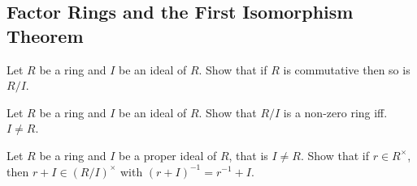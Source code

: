 \subsection{Factor Rings and the First Isomorphism Theorem}
\item Let $R$ be a ring and $I$ be an ideal of $R$. Show that if $R$ is commutative then so is $R/I$.
\item Let $R$ be a ring and $I$ be an ideal of $R$. Show that $R/I$ is a non-zero ring iff. $I \ne R$.
\item Let $R$ be a ring and $I$ be a proper ideal of $R$, that is $I \ne R$. Show that if $r \in R^{\times}$, then $r + I \in (R/I)^{\times}$ with $(r+I)^{-1} = r^{-1} + I$.